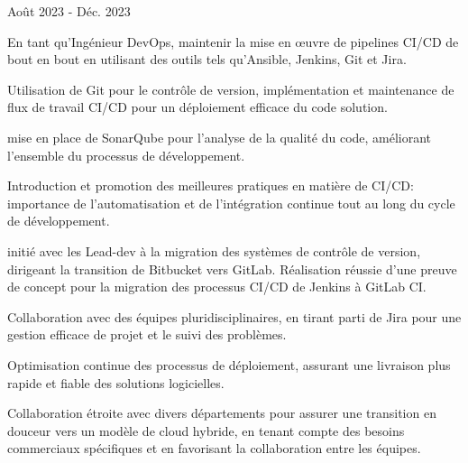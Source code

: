 \begin{cventries}
            {Août 2023 - Déc. 2023} %
            {
              \begin{cvitems} %
                \item {En tant qu'Ingénieur DevOps, maintenir la mise en œuvre de pipelines CI/CD de bout en bout en utilisant des outils tels qu'Ansible, Jenkins, Git et Jira.}
                \item {Utilisation de Git pour le contrôle de version, implémentation et maintenance de flux de travail CI/CD pour un déploiement efficace du code solution.}
                \item {mise en place  de SonarQube pour l'analyse de la qualité du code, améliorant l'ensemble du processus de développement.}
                \item {Introduction et promotion des meilleures pratiques en matière de CI/CD: importance de l'automatisation et de l'intégration continue tout au long du cycle de développement.}
                \item {initié avec les Lead-dev à la migration des systèmes de contrôle de version, dirigeant la transition de Bitbucket vers GitLab. Réalisation réussie d'une preuve de concept pour la migration des processus CI/CD de Jenkins à GitLab CI.}
                \item {Collaboration avec des équipes pluridisciplinaires, en tirant parti de Jira pour une gestion efficace de projet et le suivi des problèmes.}
                \item {Optimisation continue des processus de déploiement, assurant une livraison plus rapide et fiable des solutions logicielles.}
                \item {Collaboration étroite avec divers départements pour assurer une transition en douceur vers un modèle de cloud hybride, en tenant compte des besoins commerciaux spécifiques et en favorisant la collaboration entre les équipes.}
              \end{cvitems}
                
            }


\end{cventries}
